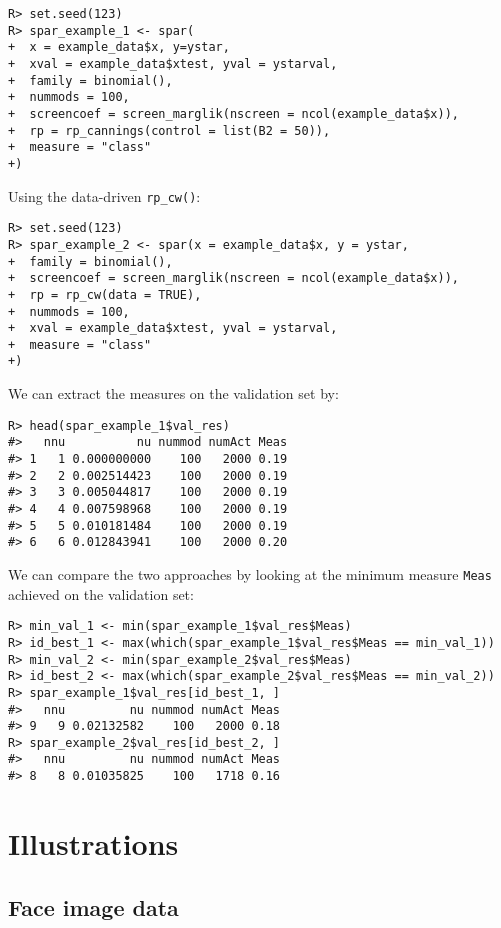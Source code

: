\documentclass[
  article]{jss}
\begin{document}
\begin{verbatim}
R> set.seed(123)   
R> spar_example_1 <- spar(
+  x = example_data$x, y=ystar,
+  xval = example_data$xtest, yval = ystarval,
+  family = binomial(),
+  nummods = 100, 
+  screencoef = screen_marglik(nscreen = ncol(example_data$x)),
+  rp = rp_cannings(control = list(B2 = 50)),
+  measure = "class"
+)
\end{verbatim}

Using the data-driven \texttt{rp\_cw()}:

\begin{verbatim}
R> set.seed(123)   
R> spar_example_2 <- spar(x = example_data$x, y = ystar,
+  family = binomial(),
+  screencoef = screen_marglik(nscreen = ncol(example_data$x)),
+  rp = rp_cw(data = TRUE),
+  nummods = 100, 
+  xval = example_data$xtest, yval = ystarval,
+  measure = "class"
+)
\end{verbatim}

We can extract the measures on the validation set by:

\begin{verbatim}
R> head(spar_example_1$val_res)
#>   nnu          nu nummod numAct Meas
#> 1   1 0.000000000    100   2000 0.19
#> 2   2 0.002514423    100   2000 0.19
#> 3   3 0.005044817    100   2000 0.19
#> 4   4 0.007598968    100   2000 0.19
#> 5   5 0.010181484    100   2000 0.19
#> 6   6 0.012843941    100   2000 0.20
\end{verbatim}

We can compare the two approaches by looking at the minimum measure
\texttt{Meas} achieved on the validation set:

\begin{verbatim}
R> min_val_1 <- min(spar_example_1$val_res$Meas)
R> id_best_1 <- max(which(spar_example_1$val_res$Meas == min_val_1))
R> min_val_2 <- min(spar_example_2$val_res$Meas)
R> id_best_2 <- max(which(spar_example_2$val_res$Meas == min_val_2))
R> spar_example_1$val_res[id_best_1, ]
#>   nnu         nu nummod numAct Meas
#> 9   9 0.02132582    100   2000 0.18
R> spar_example_2$val_res[id_best_2, ]
#>   nnu         nu nummod numAct Meas
#> 8   8 0.01035825    100   1718 0.16
\end{verbatim}

\section{Illustrations}\label{sec-illustrations}

\subsection{Face image data}\label{face-image-data}
\end{document}
